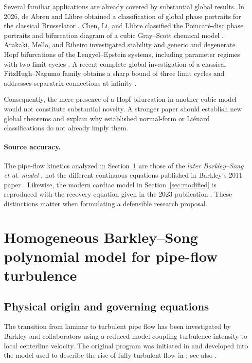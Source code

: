 \documentclass[11pt,a4paper]{article}
\begin{document}
Several familiar applications are already covered by substantial global results. In 2026, de Abreu and Llibre obtained a classification of global phase portraits for the classical Brusselator \cite{AbreuLlibre2026}. Chen, Li, and Llibre classified the Poincar\'e-disc phase portraits and bifurcation diagram of a cubic Gray--Scott chemical model \cite{ChenLiLlibre2021}. Arakaki, Mello, and Ribeiro investigated stability and generic and degenerate Hopf bifurcations of the Lengyel--Epstein systems, including parameter regimes with two limit cycles \cite{ArakakiMelloRibeiro2025}. A recent complete global investigation of a classical FitzHugh--Nagumo family obtains a sharp bound of three limit cycles and addresses separatrix connections at infinity \cite{ChenLiXiao2026}.

Consequently, the mere presence of a Hopf bifurcation in another cubic model would not constitute substantial novelty. A stronger paper should establish new global theorems and explain why established normal-form or Li\'enard classifications do not already imply them.

\paragraph{Source accuracy.}
The pipe-flow kinetics analyzed in Section~\ref{sec:barkley} are those of the \emph{later Barkley--Song et al. model} \cite{BarkleyEtAl2015}, not the different continuous equations published in Barkley's 2011 paper \cite{Barkley2011}. Likewise, the modern cardiac model in Section~\ref{sec:modified} is reproduced with the recovery equation given in the 2023 publication \cite{RheaumeEtAl2023}. These distinctions matter when formulating a defensible research proposal.

\section{Homogeneous Barkley--Song polynomial model for pipe-flow turbulence}
\label{sec:barkley}

\subsection{Physical origin and governing equations}

The transition from laminar to turbulent pipe flow has been investigated by Barkley and collaborators using a reduced model coupling turbulence intensity to local centerline velocity. The original program was initiated in \cite{Barkley2011} and developed into the model used to describe the rise of fully turbulent flow in \cite{BarkleyEtAl2015}; see also \cite{Barkley2016}.
\end{document}

